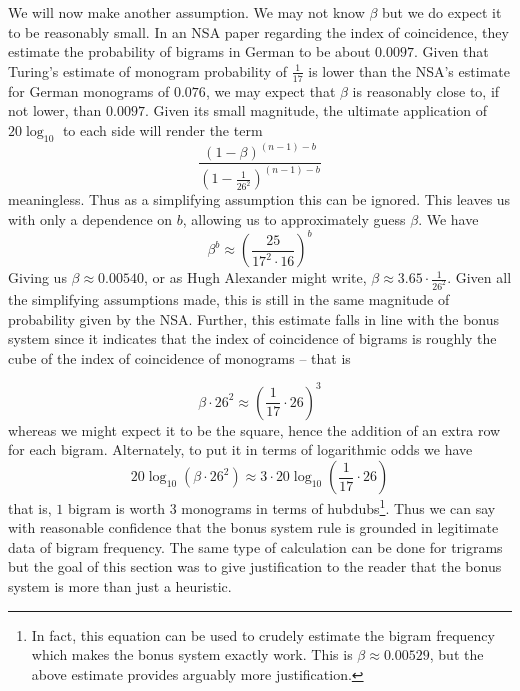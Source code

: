 
\noindent We will now make another assumption. We may not know
$\beta$ but we do expect it to be reasonably small. In an NSA paper
regarding the index of coincidence, they estimate the probability of
bigrams in German to be about $0.0097$. Given that Turing's
estimate of monogram probability of $\frac{1}{17}$ is lower than
the NSA's estimate for German monograms of $0.076$, we may expect
that $\beta$ is reasonably close to, if not lower, than $0.0097$.
Given its small magnitude, the ultimate application of
$20\log_{10}$ to each side will render the term
\[
	\frac{(1-\beta)^{(n-1)-b}}{(1-\frac{1}{26^2})^{(n-1)-b}}
\]
meaningless. Thus as a simplifying assumption this can be ignored.
This leaves us with only a dependence on $b$, allowing us to
approximately guess $\beta$. We have
\[
	\beta^b \approx
	(\frac{25}{17^2\cdot16})^b
\]
Giving us $\beta \approx 0.00540$, or as Hugh Alexander might
write, $\beta \approx 3.65\cdot\frac{1}{26^2}$. Given all the
simplifying assumptions made, this is still in the same magnitude
of probability given by the NSA. Further, this estimate falls in
line with the bonus system since it indicates that the index of
coincidence of bigrams is roughly the cube of the index of
coincidence of monograms -- that is

\[
	\beta\cdot26^2 \approx (\frac{1}{17}\cdot26)^3
\]
whereas we might expect it to be the square, hence the addition of
an extra row for each bigram. Alternately, to put it in terms of
logarithmic odds we have
\[
	20\log_{10}(\beta\cdot26^2) \approx 3\cdot20\log_{10}(\frac{1}{17}\cdot26)
\]
that is, $1$ bigram is worth $3$ monograms in terms of
hubdubs\footnote{In fact, this equation can be used to crudely
	estimate the bigram frequency which makes the bonus system exactly
	work. This is $\beta\approx0.00529$, but the above estimate
	provides arguably more justification.}. Thus we can say with reasonable
confidence that the bonus system rule is grounded in legitimate
data of bigram frequency. The same type of calculation can be done
for trigrams but the goal of this section was to give justification
to the reader that the bonus system is more than just a heuristic.

